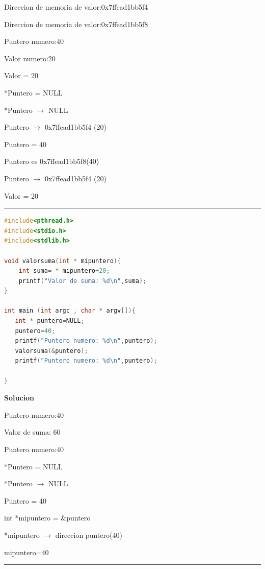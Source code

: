 \documentclass[a4paper,,onecolumn,10pt]{article}
\begin{document}
Direccion de memoria de valor:0x7ffead1bb5f4

Direccion de memoria de valor:0x7ffead1bb5f8

Puntero numero:40

Valor numero:20
\vspace{7.5mm}

Valor = 20 

*Puntero = NULL

*Puntero $\rightarrow$ NULL

Puntero $\rightarrow$ 0x7ffead1bb5f4 (20)

Puntero = 40

Puntero es 0x7ffead1bb5f8(40) 

Puntero $\rightarrow$ 0x7ffead1bb5f4 (20)

Valor = 20

\vspace{10mm}

{\color{RubineRed} \rule{\linewidth}{0.5mm} }

\begin{lstlisting}[language=C,basicstyle=\footnotesize, style=estilocodigo]
#include<pthread.h>
#include<stdio.h>
#include<stdlib.h>

void valorsuma(int * mipuntero){
    int suma= * mipuntero+20;
    printf("Valor de suma: %d\n",suma);
}

int main (int argc , char * argv[]){
   int * puntero=NULL;
   puntero=40;
   printf("Puntero numero: %d\n",puntero);
   valorsuma(&puntero);
   printf("Puntero numero: %d\n",puntero);
   
}
\end{lstlisting}

\textbf{Solucion}

Puntero numero:40

Valor de suma: 60 

Puntero numero:40

\vspace{7.5mm}

*Puntero = NULL

*Puntero $\rightarrow$ NULL

Puntero = 40

int *mipuntero = $\&$puntero

*mipuntero $\rightarrow$ direccion puntero(40)

mipuntero=40

\vspace{10mm}

{\color{RubineRed} \rule{\linewidth}{0.5mm} }
\end{document}
